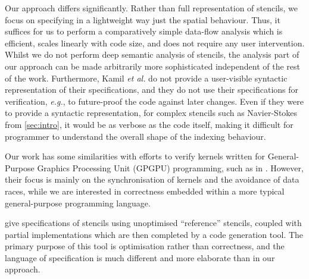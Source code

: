 \documentclass[10pt,preprint]{sigplanconf}
\theoremstyle{definition}
\newcommand{\eg}{\emph{e.g.}}
\begin{document}
Our approach differs significantly. Rather than 
full representation of stencils, we focus on specifying
in a lightweight way just the spatial behaviour.
Thus, it suffices for us to perform a comparatively
simple data-flow analysis which is efficient, scales linearly with
code size, and does not require any user intervention.
Whilst we do not perform deep semantic analysis of stencils,
 the analysis part of our
approach can be made arbitrarily more sophisticated independent of the rest of
the work.
%
Furthermore, Kamil \emph{et al.} do not provide a user-visible
syntactic representation of their specifications, and they do
not use their specifications for verification, \eg{}, to future-proof
the code against later changes. Even if they were to provide a
syntactic representation, for complex stencils such as Navier-Stokes
from \cref{sec:intro}, it would be as verbose as the code itself,
making it difficult for programmer to understand the overall shape of
the indexing behaviour.

Our work has some similarities with efforts to verify kernels
written for General-Purpose Graphics Processing Unit (GPGPU)
programming, such as in \citet{Blom:2014:SoCP}. %
However, their focus is
mainly on the synchronisation of kernels and the avoidance of
data races, while we are interested in correctness 
embedded within a more typical general-purpose programming
language. %

\citet{Solar-Lezama:2007:PLDI} give specifications of stencils using
unoptimised ``reference'' stencils, coupled with partial
implementations which are then completed by a code
generation tool. %
The primary purpose of this tool is optimisation rather than
correctness, and the language of specification is much different and
more elaborate than in our approach.
\end{document}
